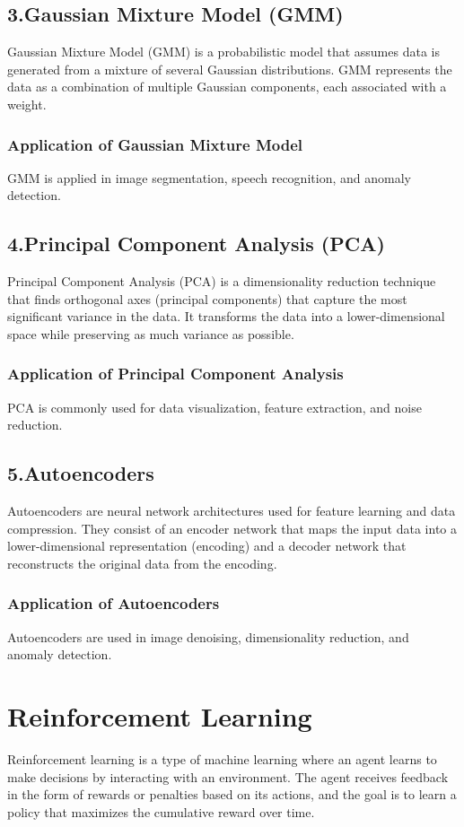 \documentclass{article}
\begin{document}
\subsection{3.Gaussian Mixture Model (GMM)}
Gaussian Mixture Model (GMM) is a probabilistic model that assumes data is generated from a mixture of several Gaussian distributions. GMM represents the data as a combination of multiple Gaussian components, each associated with a weight.

\subsubsection{Application of Gaussian Mixture Model}
GMM is applied in image segmentation, speech recognition, and anomaly detection.

\subsection{4.Principal Component Analysis (PCA)}
Principal Component Analysis (PCA) is a dimensionality reduction technique that finds orthogonal axes (principal components) that capture the most significant variance in the data. It transforms the data into a lower-dimensional space while preserving as much variance as possible.

\subsubsection{Application of Principal Component Analysis}
PCA is commonly used for data visualization, feature extraction, and noise reduction.

\subsection{5.Autoencoders}
Autoencoders are neural network architectures used for feature learning and data compression. They consist of an encoder network that maps the input data into a lower-dimensional representation (encoding) and a decoder network that reconstructs the original data from the encoding.

\subsubsection{Application of Autoencoders}
Autoencoders are used in image denoising, dimensionality reduction, and anomaly detection.



\section{Reinforcement Learning}
Reinforcement learning is a type of machine learning where an agent learns to make decisions by interacting with an environment. The agent receives feedback in the form of rewards or penalties based on its actions, and the goal is to learn a policy that maximizes the cumulative reward over time.
\end{document}
